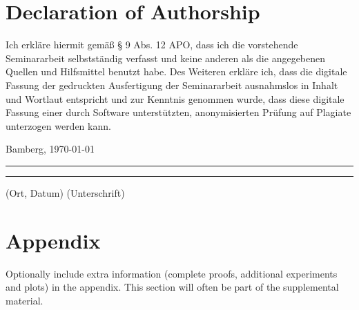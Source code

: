 \documentclass[a4paper]{article}
\begin{document}
{\parindent 0cm
\section*{Declaration of Authorship}
Ich erkläre hiermit gemäß § 9 Abs. 12 APO, dass ich die vorstehende Seminararbeit selbstständig verfasst und keine anderen als die angegebenen Quellen und Hilfsmittel benutzt habe. Des Weiteren erkläre ich, dass die digitale Fassung der gedruckten Ausfertigung der Seminararbeit ausnahmslos in Inhalt und Wortlaut entspricht und zur Kenntnis genommen wurde, dass diese digitale Fassung einer durch Software unterstützten, anonymisierten Prüfung auf Plagiate unterzogen werden kann.\\
\vspace{2\baselineskip}
  
Bamberg, \today

\rule[0.5em]{14em}{0.5pt} \hspace{0.25\linewidth}\rule[0.5em]{14em}{0.5pt}
\vspace{1em}
\hspace{4em} (Ort, Datum) \hspace{0.51\linewidth} (Unterschrift)
}







\appendix


\section{Appendix}


Optionally include extra information (complete proofs, additional experiments and plots) in the appendix.
This section will often be part of the supplemental material.
\end{document}
